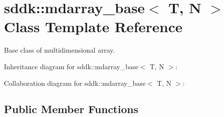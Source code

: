 \hypertarget{classsddk_1_1mdarray__base}{}\section{sddk\+:\+:mdarray\+\_\+base$<$ T, N $>$ Class Template Reference}
\label{classsddk_1_1mdarray__base}


Base class of multidimensional array.  




Inheritance diagram for sddk\+:\+:mdarray\+\_\+base$<$ T, N $>$\+:


Collaboration diagram for sddk\+:\+:mdarray\+\_\+base$<$ T, N $>$\+:
\subsection*{Public Member Functions}
